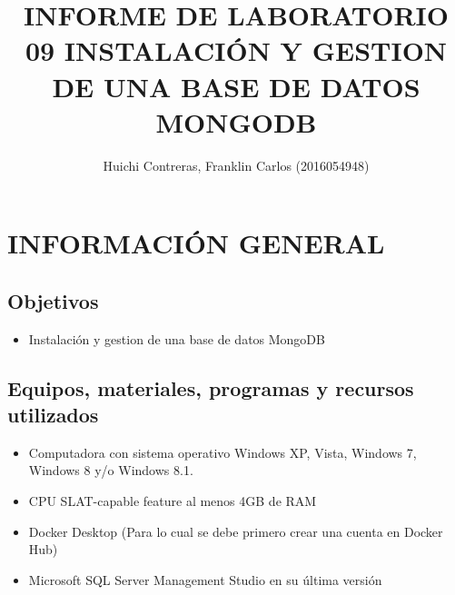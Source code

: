 \documentclass[preprint,12pt]{elsarticle}
\begin{document}
	
	\begin{frontmatter} 

		\title{\huge INFORME DE LABORATORIO 09 INSTALACIÓN Y GESTION DE UNA BASE DE DATOS MONGODB}
		
		\author{Huichi Contreras, Franklin Carlos         	(2016054948)} 
		\address{Escuela Profesional de Ingeniería de Sistemas}
		\address{Universidad Privada de Tacna}
		\address{Tacna, Perú}
		

	\end{frontmatter}


\section{INFORMACIÓN GENERAL} 

\subsection {\textbf{Objetivos}}
\begin{itemize}
	\item Instalación y gestion de una base de datos MongoDB
\end{itemize}

\subsection {\textbf{Equipos, materiales, programas y recursos utilizados}}
\begin{itemize}
	\item Computadora con sistema operativo Windows XP, Vista, Windows 7, Windows 8 y/o Windows 8.1.
	\item CPU SLAT-capable feature al menos 4GB de RAM
	\item Docker Desktop (Para lo cual se debe primero crear una cuenta en Docker Hub)
	\item Microsoft SQL Server Management Studio en su última versión
\end{itemize}



\end{document}
